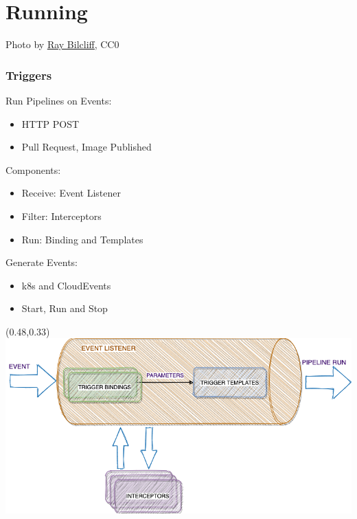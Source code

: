 \documentclass[aspectratio=169,11pt,hyperref={colorlinks=true}]{beamer}
\begin{document}
\section[Running]{Running}

\begin{sectionwithpic}{Photo by \href{https://www.pexels.com/@raybilcliff}{\underline{Ray Bilcliff}}, CC0}
\end{sectionwithpic}

\begin{lgrayrwhiteframe}
  \frametitle{Triggers}
  Run Pipelines on Events:
  \begin{itemize}
    \item HTTP POST
    \item Pull Request, Image Published
  \end{itemize}
  \vspace{0.02\paperheight}
  Components:
  \begin{itemize}
    \item Receive: Event Listener
    \item Filter: Interceptors
    \item Run: Binding and Templates
  \end{itemize}
  \vspace{0.02\paperheight}
  Generate Events:
  \begin{itemize}
    \item k8s and CloudEvents
    \item Start, Run and Stop
  \end{itemize}
  \begin{textblock*}{0.51\paperwidth}(0.48\paperwidth,0.33\paperheight)
    \includegraphics[width=0.5\paperwidth]{img/tekton-triggers.png}
  \end{textblock*}
\end{lgrayrwhiteframe}
\end{document}
